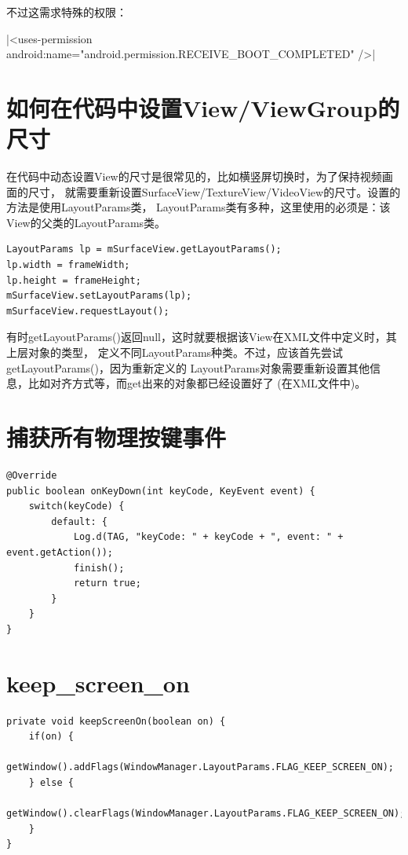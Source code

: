 ﻿\documentclass[a4paper,11pt]{article}
\begin{document}
  不过这需求特殊的权限：\par
  |<uses-permission android:name="android.permission.RECEIVE_BOOT_COMPLETED" />|


  \section[如何在代码中设置View/ViewGroup的尺寸]{如何在代码中设置View/ViewGroup的尺寸}
  在代码中动态设置View的尺寸是很常见的，比如横竖屏切换时，为了保持视频画面的尺寸，
  就需要重新设置SurfaceView/TextureView/VideoView的尺寸。设置的方法是使用LayoutParams类，
  LayoutParams类有多种，这里使用的必须是：该View的父类的LayoutParams类。

\begin{verbatim}
LayoutParams lp = mSurfaceView.getLayoutParams();
lp.width = frameWidth;
lp.height = frameHeight;
mSurfaceView.setLayoutParams(lp);
mSurfaceView.requestLayout();
\end{verbatim}

  有时getLayoutParams()返回null，这时就要根据该View在XML文件中定义时，其上层对象的类型，
  定义不同LayoutParams种类。不过，应该首先尝试getLayoutParams()，因为重新定义的
  LayoutParams对象需要重新设置其他信息，比如对齐方式等，而get出来的对象都已经设置好了
  (在XML文件中)。

  \section[捕获所有物理按键事件]{捕获所有物理按键事件}
  \begin{verbatim}
@Override
public boolean onKeyDown(int keyCode, KeyEvent event) {
    switch(keyCode) {
        default: {
            Log.d(TAG, "keyCode: " + keyCode + ", event: " + event.getAction());
            finish();
            return true;
        }
    }
}
  \end{verbatim}

  \section[keep\_screen\_on]{keep\_screen\_on}
  \begin{verbatim}
private void keepScreenOn(boolean on) {
    if(on) {
        getWindow().addFlags(WindowManager.LayoutParams.FLAG_KEEP_SCREEN_ON);
    } else {
        getWindow().clearFlags(WindowManager.LayoutParams.FLAG_KEEP_SCREEN_ON);
    }
}
  \end{verbatim}
\end{document}

